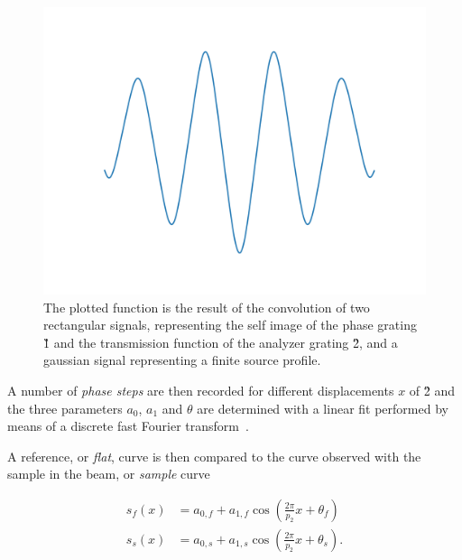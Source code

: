 \begin{figure}[htb]
    \centering
    \includegraphics[width=\textwidth]{gfx/sinusoidal-phase-stepping/sinusoidal-phase-stepping.png}
    \caption[Convolution of two rectangular and a gaussian signal.]{The
        plotted function is the result of the convolution of two rectangular
        signals, representing the self image of the phase grating \G1 and the
        transmission function of the analyzer grating \G2, and a gaussian
    signal representing a finite source profile.}
    \label{fig:phase.stepping.sinusoidal}
\end{figure}


A number of \emph{phase steps} are then recorded for different displacements
$x$ of \G2 and the three parameters $a_0$, $a_1$ and $\theta$ are determined
with a linear fit performed by means of a discrete fast Fourier transform~\cite{FFTEquivalence}.

A reference, or \emph{flat}, curve is then compared to the curve observed
with the sample in the beam, or \emph{sample} curve

\begin{align}
    s_f(x) &= a_{0,f} + a_{1,f} \cos\left(\frac{2 \pi}{p_2} x + \theta_{f}\right)\\
    s_s(x) &= a_{0,s} + a_{1,s} \cos\left(\frac{2 \pi}{p_2} x +
    \theta_{s}\right).
    \label{eq:flat}
\end{align}

